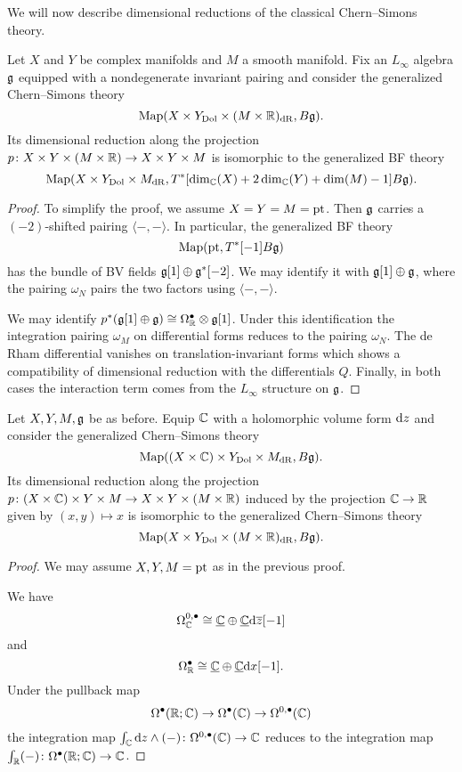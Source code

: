 \documentclass[10pt, oneside]{article}
\begin{document}
We will now describe dimensional reductions of the classical Chern--Simons theory.

\begin{prop} \label{CS_to_BF_diml_red_prop}
Let $X$ and $Y$ be complex manifolds and $M$ a smooth manifold. Fix an $L_\infty$ algebra $\mathfrak g$ equipped with a nondegenerate invariant pairing and consider the generalized Chern--Simons theory
\[\operatorname{Map}(X\times Y_{\mathrm{Dol}}\times (M\times \mathbb R)_{\mathrm{dR}}, B\mathfrak g).\]
Its dimensional reduction along the projection $p\colon X\times Y\times (M\times \mathbb R)\rightarrow X\times Y\times M$ is isomorphic to the generalized BF theory
\[\operatorname{Map}(X\times Y_{\mathrm{Dol}}\times M_{\mathrm{dR}}, T^*[\dim_\mathbb C(X) + 2\dim_\mathbb C(Y) + \dim(M) - 1] B\mathfrak g).\]
\end{prop}

\begin{proof}
To simplify the proof, we assume $X=Y=M=\operatorname{pt}$. Then $\mathfrak g$ carries a $(-2)$-shifted pairing $\langle-,-\rangle$. In particular, the generalized BF theory
\[\operatorname{Map}(\operatorname{pt}, T^*[-1] B \mathfrak g)\]
has the bundle of BV fields $\mathfrak g[1] \oplus \mathfrak g^*[-2]$. We may identify it with $\mathfrak g[1]\oplus \mathfrak g$, where the pairing $\omega_N$ pairs the two factors using $\langle-,-\rangle$.

We may identify $p^*(\mathfrak g[1]\oplus \mathfrak g)\cong \Omega^\bullet_{\mathbb R}\otimes \mathfrak g[1]$. Under this identification the integration pairing $\omega_M$ on differential forms reduces to the pairing $\omega_N$. The de Rham differential vanishes on translation-invariant forms which shows a compatibility of dimensional reduction with the differentials $Q$. Finally, in both cases the interaction term comes from the $L_\infty$ structure on $\mathfrak g$.
\end{proof}

\begin{prop} \label{CS_diml_red_prop}
Let $X,Y,M,\mathfrak g$ be as before. Equip $\mathbb C$ with a holomorphic volume form ${\rm d} z$ and consider the generalized Chern--Simons theory
\[\operatorname{Map}((X\times \mathbb C)\times Y_{\mathrm{Dol}}\times M_{\mathrm{dR}}, B\mathfrak g).\]
Its dimensional reduction along the projection $p\colon (X\times \mathbb C)\times Y\times M\rightarrow X\times Y\times (M\times \mathbb R)$ induced by the projection $\mathbb C\rightarrow \mathbb R$ given by $(x, y)\mapsto x$ is isomorphic to the generalized Chern--Simons theory
\[\operatorname{Map}(X\times Y_{\mathrm{Dol}}\times (M\times \mathbb R)_{\mathrm{dR}}, B\mathfrak g).\]
\end{prop}

\begin{proof}
We may assume $X,Y,M=\operatorname{pt}$ as in the previous proof.

We have
\[\Omega^{0, \bullet}_{\mathbb C}\cong \underline{\mathbb C}\oplus \underline{\mathbb C}{\rm d} \overline{z}[-1]\]
and
\[\Omega^\bullet_{\mathbb R}\cong \underline{\mathbb C}\oplus \underline{\mathbb C} {\rm d} x[-1].\]
Under the pullback map
\[\Omega^\bullet(\mathbb R; \mathbb C)\rightarrow \Omega^\bullet(\mathbb C)\rightarrow \Omega^{0, \bullet}(\mathbb C)\]
the integration map $\int_\mathbb C {\rm d} z\wedge (-)\colon \Omega^{0, \bullet}(\mathbb C)\rightarrow \mathbb C$ reduces to the integration map $\int_\mathbb R (-)\colon \Omega^{\bullet}(\mathbb R;\mathbb C)\rightarrow \mathbb C$.
\end{proof}
\end{document}
